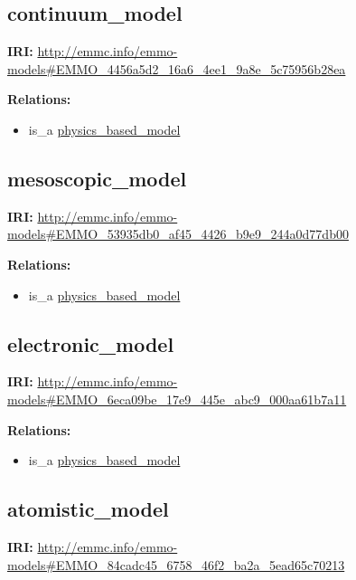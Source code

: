 \documentclass[a4paper,]{report}
\providecommand{\tightlist}{%
  \setlength{\itemsep}{0pt}\setlength{\parskip}{0pt}}
\begin{document}
\hypertarget{continuum_model-1}{%
\subsection{continuum\_model}\label{continuum_model-1}}

\textbf{IRI:}
\url{http://emmc.info/emmo-models\#EMMO_4456a5d2_16a6_4ee1_9a8e_5c75956b28ea}

\textbf{Relations:}

\begin{itemize}
\tightlist
\item
  is\_a \protect\hyperlink{physics_based_model}{physics\_based\_model}
\end{itemize}

\hypertarget{mesoscopic_model-1}{%
\subsection{mesoscopic\_model}\label{mesoscopic_model-1}}

\textbf{IRI:}
\url{http://emmc.info/emmo-models\#EMMO_53935db0_af45_4426_b9e9_244a0d77db00}

\textbf{Relations:}

\begin{itemize}
\tightlist
\item
  is\_a \protect\hyperlink{physics_based_model}{physics\_based\_model}
\end{itemize}

\hypertarget{electronic_model-1}{%
\subsection{electronic\_model}\label{electronic_model-1}}

\textbf{IRI:}
\url{http://emmc.info/emmo-models\#EMMO_6eca09be_17e9_445e_abc9_000aa61b7a11}

\textbf{Relations:}

\begin{itemize}
\tightlist
\item
  is\_a \protect\hyperlink{physics_based_model}{physics\_based\_model}
\end{itemize}

\hypertarget{atomistic_model-1}{%
\subsection{atomistic\_model}\label{atomistic_model-1}}

\textbf{IRI:}
\url{http://emmc.info/emmo-models\#EMMO_84cadc45_6758_46f2_ba2a_5ead65c70213}
\end{document}
